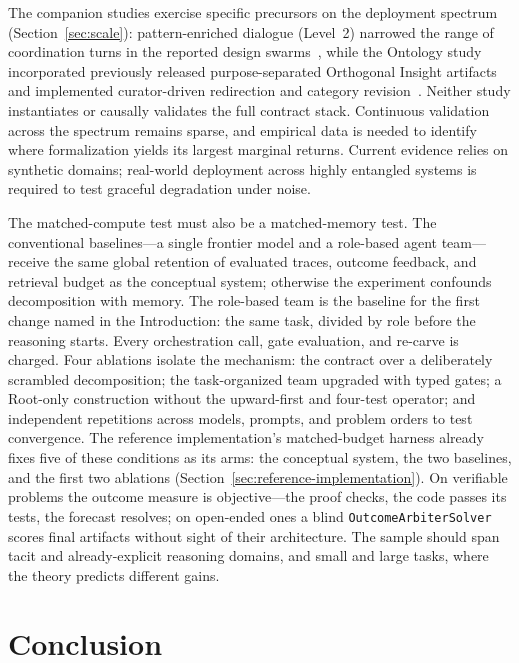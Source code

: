 \documentclass[11pt]{article}
\let\oldtexttt\texttt
\renewcommand{\texttt}[1]{\oldtexttt{\small #1}}
\begin{document}
The companion studies exercise specific precursors on the deployment spectrum (Section~\ref{sec:scale}): pattern-enriched dialogue (Level~2) narrowed the range of coordination turns in the reported design swarms~\cite{westerberg2026sema}, while the Ontology study incorporated previously released purpose-separated Orthogonal Insight artifacts and implemented curator-driven redirection and category revision~\cite{westerberg2025strangeworlds,westerberg2026ontology}. Neither study instantiates or causally validates the full contract stack. Continuous validation across the spectrum remains sparse, and empirical data is needed to identify where formalization yields its largest marginal returns. Current evidence relies on synthetic domains; real-world deployment across highly entangled systems is required to test graceful degradation under noise.

The matched-compute test must also be a matched-memory test. The conventional baselines---a single frontier model and a role-based agent team---receive the same global retention of evaluated traces, outcome feedback, and retrieval budget as the conceptual system; otherwise the experiment confounds decomposition with memory. The role-based team is the baseline for the first change named in the Introduction: the same task, divided by role before the reasoning starts. Every orchestration call, gate evaluation, and re-carve is charged. Four ablations isolate the mechanism: the contract over a deliberately scrambled decomposition; the task-organized team upgraded with typed gates; a Root-only construction without the upward-first and four-test operator; and independent repetitions across models, prompts, and problem orders to test convergence. The reference implementation's matched-budget harness already fixes five of these conditions as its arms: the conceptual system, the two baselines, and the first two ablations (Section~\ref{sec:reference-implementation}). On verifiable problems the outcome measure is objective---the proof checks, the code passes its tests, the forecast resolves; on open-ended ones a blind \texttt{OutcomeArbiterSolver} scores final artifacts without sight of their architecture. The sample should span tacit and already-explicit reasoning domains, and small and large tasks, where the theory predicts different gains.

\section{Conclusion}
\end{document}
